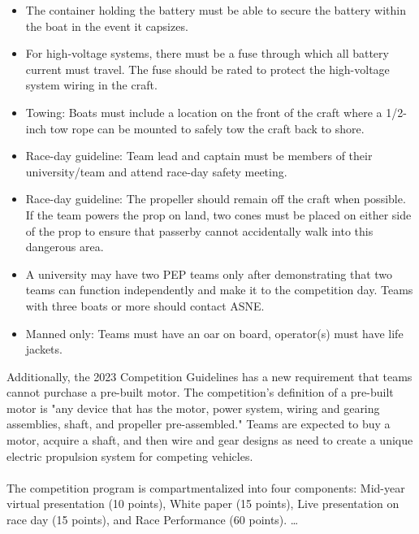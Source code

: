 \documentclass{article}
\begin{document}
\begin{itemize}
    \item The container holding the battery must be able to secure the battery within the boat in the event it capsizes.
    \item For high-voltage systems, there must be a fuse through which all battery current must travel. The fuse should be rated to protect the high-voltage system wiring in the craft. 
    \item Towing: Boats must include a location on the front of the craft where a 1/2-inch tow rope can be mounted to safely tow the craft back to shore. 
    \item Race-day guideline: Team lead and captain must be members of their university/team and attend race-day safety meeting.
    \item Race-day guideline: The propeller should remain off the craft when possible. If the team powers the prop on land, two cones must be placed on either side of the prop to ensure that passerby cannot accidentally walk into this dangerous area.
    \item A university may have two PEP teams only after demonstrating that two teams can function independently and make it to the competition day. Teams with three boats or more should contact ASNE.
    \item Manned only: Teams must have an oar on board, operator(s) must have life jackets. 
    \end{itemize} 
    Additionally, the 2023 Competition Guidelines has a new requirement that teams cannot purchase a pre-built motor. The competition's definition of a pre-built motor is "any device that has the motor, power system, wiring and gearing assemblies, shaft, and propeller pre-assembled." Teams are expected to buy a motor, acquire a shaft, and then wire and gear designs as need to create a unique electric propulsion system for competing vehicles. \\ \\ 
    The competition program is compartmentalized into four components: Mid-year virtual presentation (10 points), White paper (15 points), Live presentation on race day (15 points), and Race Performance (60 points). 
\ldots
\pagebreak
\end{document}
